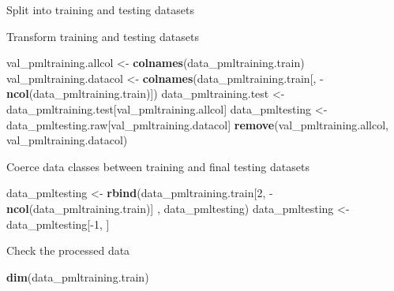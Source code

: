 \documentclass[]{article}
\newenvironment{Shaded}{\begin{snugshade}}{\end{snugshade}}
\newcommand{\KeywordTok}[1]{\textcolor[rgb]{0.13,0.29,0.53}{\textbf{{#1}}}}
\newcommand{\DataTypeTok}[1]{\textcolor[rgb]{0.13,0.29,0.53}{{#1}}}
\newcommand{\DecValTok}[1]{\textcolor[rgb]{0.00,0.00,0.81}{{#1}}}
\newcommand{\FloatTok}[1]{\textcolor[rgb]{0.00,0.00,0.81}{{#1}}}
\newcommand{\StringTok}[1]{\textcolor[rgb]{0.31,0.60,0.02}{{#1}}}
\newcommand{\OtherTok}[1]{\textcolor[rgb]{0.56,0.35,0.01}{{#1}}}
\newcommand{\NormalTok}[1]{{#1}}
\begin{document}
Split into training and testing datasets

\begin{Shaded}
\end{Shaded}

Transform training and testing datasets

\begin{Shaded}
\begin{Highlighting}[]
\NormalTok{val_pmltraining.allcol <-}\StringTok{ }\KeywordTok{colnames}\NormalTok{(data_pmltraining.train)}
\NormalTok{val_pmltraining.datacol <-}\StringTok{ }\KeywordTok{colnames}\NormalTok{(data_pmltraining.train[, -}\KeywordTok{ncol}\NormalTok{(data_pmltraining.train)])}
\NormalTok{data_pmltraining.test <-}\StringTok{ }\NormalTok{data_pmltraining.test[val_pmltraining.allcol]}
\NormalTok{data_pmltesting <-}\StringTok{ }\NormalTok{data_pmltesting.raw[val_pmltraining.datacol]}
\KeywordTok{remove}\NormalTok{(val_pmltraining.allcol, val_pmltraining.datacol)}
\end{Highlighting}
\end{Shaded}

Coerce data classes between training and final testing datasets

\begin{Shaded}
\begin{Highlighting}[]
\NormalTok{data_pmltesting <-}\StringTok{ }\KeywordTok{rbind}\NormalTok{(data_pmltraining.train[}\DecValTok{2}\NormalTok{, -}\KeywordTok{ncol}\NormalTok{(data_pmltraining.train)] , data_pmltesting)}
\NormalTok{data_pmltesting <-}\StringTok{ }\NormalTok{data_pmltesting[-}\DecValTok{1}\NormalTok{, ]}
\end{Highlighting}
\end{Shaded}

Check the processed data

\begin{Shaded}
\begin{Highlighting}[]
\KeywordTok{dim}\NormalTok{(data_pmltraining.train)}
\end{Highlighting}
\end{Shaded}
\end{document}
